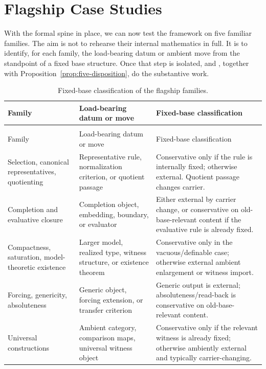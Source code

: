\section{Flagship Case Studies}\label{sec:case-studies}

With the formal spine in place, we can now test the framework on five familiar families. The aim is not to rehearse their internal mathematics in full. It is to identify, for each family, the load-bearing datum or ambient move from the standpoint of a fixed base structure. Once that step is isolated,  and , together with Proposition~\ref{prop:five-disposition}, do the substantive work.

\begingroup
\small
\setlength{\LTleft}{0pt}
\setlength{\LTright}{0pt}
\renewcommand{\arraystretch}{1.12}
\begin{longtable}{>{\raggedright\arraybackslash}p{} >{\raggedright\arraybackslash}p{} >{\raggedright\arraybackslash}p{}}
\caption{Fixed-base classification of the flagship families.}\label{tab:flagship-families}\\
\toprule
Family & Load-bearing datum or move & Fixed-base classification \\
\midrule
\endfirsthead
\multicolumn{3}{@{}l}{\footnotesize\itshape Table \thetable{} continued.}\\
\toprule
Family & Load-bearing datum or move & Fixed-base classification \\
\midrule
\endhead
Selection, canonical representatives, quotienting & Representative rule, normalization criterion, or quotient passage & Conservative only if the rule is internally fixed; otherwise external. Quotient passage changes carrier. \\
Completion and evaluative closure & Completion object, embedding, boundary, or evaluator & Either external by carrier change, or conservative on old-base-relevant content if the evaluative rule is already fixed. \\
Compactness, saturation, model-theoretic existence & Larger model, realized type, witness structure, or existence theorem & Conservative only in the vacuous/definable case; otherwise external ambient enlargement or witness import. \\
Forcing, genericity, absoluteness & Generic object, forcing extension, or transfer criterion & Generic output is external; absoluteness/read-back is conservative on old-base-relevant content. \\
Universal constructions & Ambient category, comparison maps, universal witness object & Conservative only if the relevant witness is already fixed; otherwise ambiently external and typically carrier-changing. \\
\bottomrule
\end{longtable}
\endgroup

